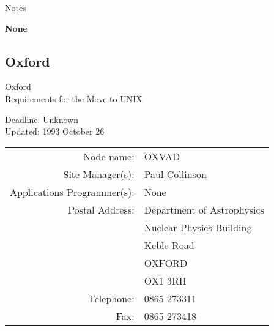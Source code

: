 \vspace{5mm}
\begin{center}
{\large\sc Notes}
\end{center}

{\bf None}


\newpage
\subsection{Oxford}

\renewcommand{\starsitename}{Oxford}
\renewcommand{\starnodename}{OXVAD}

\renewcommand{\starunixdate}{Unknown}
\renewcommand{\starupdate}{1993 October 26}

\renewcommand{\starsitetelephone}{0865 273311}
\renewcommand{\starsitefax}{0865 273418}

\begin{center}
{\Large\sc \starsitename \\ [2ex]
           Requirements for the Move to UNIX}

\vspace{3mm}
{\large\sc Deadline: \starunixdate \\ [1ex]
           Updated: \starupdate}
\end{center}

\vspace{5mm}

\begin{center}
\begin{tabular}{rl}
{\sc Node name:}                  & \starnodename \\
{\sc Site Manager(s):}            & Paul Collinson \\
{\sc Applications Programmer(s):} & None \\
{\sc Postal Address:}             & Department of Astrophysics \\
                                  & Nuclear Physics Building \\
                                  & Keble Road \\
                                  & OXFORD \\
                                  & OX1 3RH \\
{\sc Telephone:}                  & \starsitetelephone \\
{\sc Fax:}                        & \starsitefax \\
\end{tabular}
\end{center}

